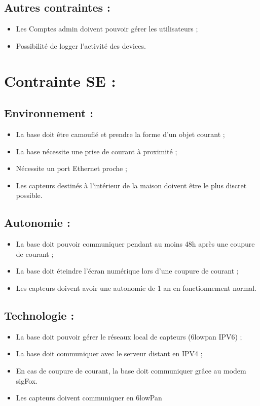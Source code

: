 \subsection{Autres contraintes :}
\begin{itemize}
	\item Les Comptes admin doivent pouvoir gérer les utilisateurs ;
	\item Possibilité de logger l'activité des devices.\\
\end{itemize}


\section{Contrainte SE :}
\subsection{Environnement :}
\begin{itemize}
	\item La base doit être camouflé et prendre la forme d'un objet courant ;
	\item La base nécessite une prise de courant à proximité ;
	\item Nécessite un port Ethernet proche ;
	\item Les capteurs destinés à l'intérieur de la maison doivent être le plus discret possible.\\
\end{itemize}

\subsection{Autonomie :}
\begin{itemize}
	\item La base doit pouvoir communiquer pendant au moins 48h après une coupure de courant ;
	\item La base doit éteindre l'écran numérique lors d'une coupure de courant ;
	\item Les capteurs doivent avoir une autonomie de 1 an en fonctionnement normal.\\
\end{itemize}

\subsection{Technologie :}
\begin{itemize}
	\item La base doit pouvoir gérer le réseaux local de capteurs (6lowpan IPV6) ;
	\item La base doit communiquer avec le serveur distant en IPV4 ;
	\item En cas de coupure de courant, la base doit communiquer grâce au modem sigFox.
	\item Les capteurs doivent communiquer en 6lowPan\\
\end{itemize}
